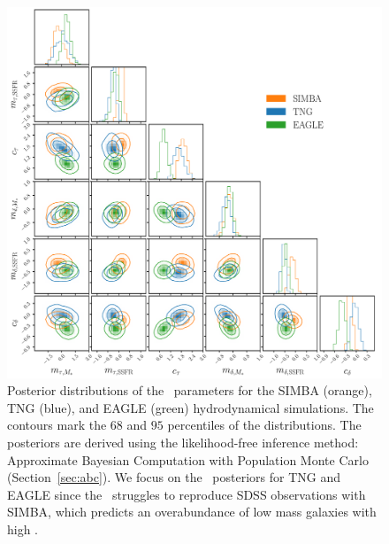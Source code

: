 \begin{figure}
\begin{center}
    \includegraphics[width=\textwidth]{figs/abc.pdf}
    \caption{\label{fig:abc}
    Posterior distributions of the \eda~parameters for the SIMBA (orange), TNG
    (blue), and EAGLE (green) hydrodynamical simulations. The contours mark the $68$
    and $95$ percentiles of the distributions. The posteriors are derived using the
    likelihood-free inference method: Approximate Bayesian Computation with
    Population Monte Carlo (Section~\ref{sec:abc}). We focus on the
    \eda~posteriors for TNG and EAGLE since the \eda~struggles to reproduce
    SDSS observations with SIMBA, which predicts an overabundance of low mass
    galaxies with high \sfr.%
    }
\end{center}
\end{figure}

